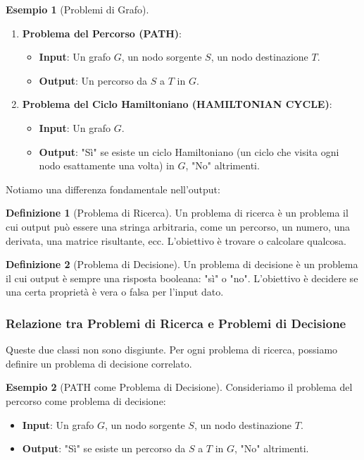 \documentclass[a4paper]{article}
\theoremstyle{definition} %
\newtheorem{definition}{Definizione}
\newtheorem{example}{Esempio}
\begin{document}
\begin{example}[Problemi di Grafo]
\begin{enumerate}
    \item \textbf{Problema del Percorso (PATH)}:
    \begin{itemize}
        \item \textbf{Input}: Un grafo $G$, un nodo sorgente $S$, un nodo destinazione $T$.
        \item \textbf{Output}: Un percorso da $S$ a $T$ in $G$.
    \end{itemize}
    \item \textbf{Problema del Ciclo Hamiltoniano (HAMILTONIAN CYCLE)}:
    \begin{itemize}
        \item \textbf{Input}: Un grafo $G$.
        \item \textbf{Output}: "Sì" se esiste un ciclo Hamiltoniano (un ciclo che visita ogni nodo esattamente una volta) in $G$, "No" altrimenti.
    \end{itemize}
\end{enumerate}
\end{example}

Notiamo una differenza fondamentale nell'output:

\begin{definition}[Problema di Ricerca]
Un problema di ricerca è un problema il cui output può essere una stringa arbitraria, come un percorso, un numero, una derivata, una matrice risultante, ecc. L'obiettivo è trovare o calcolare qualcosa.
\end{definition}

\begin{definition}[Problema di Decisione]
Un problema di decisione è un problema il cui output è sempre una risposta booleana: "sì" o "no". L'obiettivo è decidere se una certa proprietà è vera o falsa per l'input dato.
\end{definition}

\subsubsection{Relazione tra Problemi di Ricerca e Problemi di Decisione}
Queste due classi non sono disgiunte. Per ogni problema di ricerca, possiamo definire un problema di decisione correlato.

\begin{example}[PATH come Problema di Decisione]
Consideriamo il problema del percorso come problema di decisione:
\begin{itemize}
    \item \textbf{Input}: Un grafo $G$, un nodo sorgente $S$, un nodo destinazione $T$.
    \item \textbf{Output}: "Sì" se esiste un percorso da $S$ a $T$ in $G$, "No" altrimenti.
\end{itemize}
\end{example}
\end{document}
